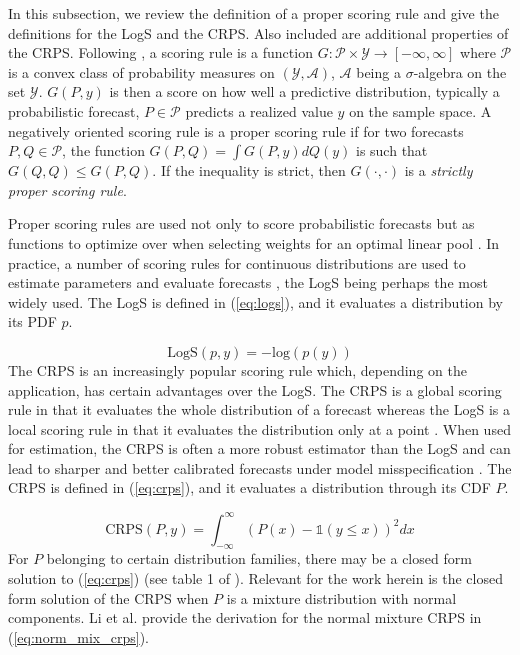 In this subsection, we review the definition of a proper scoring rule and 
give the definitions for the LogS and the CRPS. Also included are additional 
properties of the CRPS. 
Following \cite{gneiting2007strictly}, a scoring rule is a function 
$G:\mathcal{P} \times \mathcal{Y} \rightarrow [-\infty, \infty]$ where 
$\mathcal{P}$ is a convex class of probability measures on 
$(\mathcal{Y}, \mathcal{A})$, $\mathcal{A}$ being a $\sigma$-algebra on the 
set $\mathcal{Y}$.  $G(P, y)$ is then a score on how well a predictive 
distribution, typically a probabilistic forecast, $P \in \mathcal{P}$ 
predicts a realized value $y$ on the sample space. A negatively oriented 
scoring rule is a proper scoring rule if for two forecasts 
$P, Q \in \mathcal{P}$, the function $G(P, Q) = \int G(P, y)dQ(y)$ is such 
that $G(Q,Q) \leq G(P,Q)$. If the inequality is strict, then $G(\cdot, \cdot)$ 
is a \textit{strictly proper scoring rule}.

 Proper scoring rules are used not only to score probabilistic forecasts but 
 as functions to optimize over when selecting weights for an optimal linear 
 pool \cite[]{lavine2021adaptive,li2019combining,yao2018using,
 thorey2017online,geweke2011optimal}. 
In practice, a number of scoring rules for continuous distributions are used 
to estimate parameters and evaluate forecasts 
\cite[for some examples]{gneiting2014probabilistic, gneiting2007probabilistic}, 
the LogS being perhaps the most widely used. The LogS is defined in 
(\ref{eq:logs}), and it evaluates a distribution by its PDF $p$. 

\begin{equation}
    \label{eq:logs}
    \text{LogS}(p, y) = -\text{log}(p(y))
\end{equation}
The CRPS is an increasingly popular scoring rule which, depending on the 
application, has certain advantages over the LogS. The CRPS is a global 
scoring rule in that it evaluates the whole distribution of a forecast 
whereas the LogS is a local scoring rule in that it evaluates the distribution 
only at a point \cite[]{gneiting2014probabilistic}. When used for estimation, 
the CRPS is often a more robust estimator than the LogS and can lead to 
sharper and better calibrated forecasts under model misspecification 
\cite[]{gebetsberger2018estimation,gneiting2005calibrated}. The CRPS is 
defined in (\ref{eq:crps}), and it evaluates a distribution through its CDF $P$.


\begin{equation}
    \label{eq:crps}
    \text{CRPS}(P, y) = \int_{-\infty}^{\infty} (P(x) - \mathds{1}
    (y \leq x))^2 dx
\end{equation}
For $P$ belonging to certain distribution families, there may be a closed 
form solution to (\ref{eq:crps}) (see table 1 of \cite{zamo2018estimation}). 
Relevant for the work herein is the closed form solution of the 
CRPS when $P$ is a mixture distribution with normal components. 
Li et al.
\cite{li2019combining} provide the derivation for the normal mixture CRPS 
in (\ref{eq:norm_mix_crps}).

